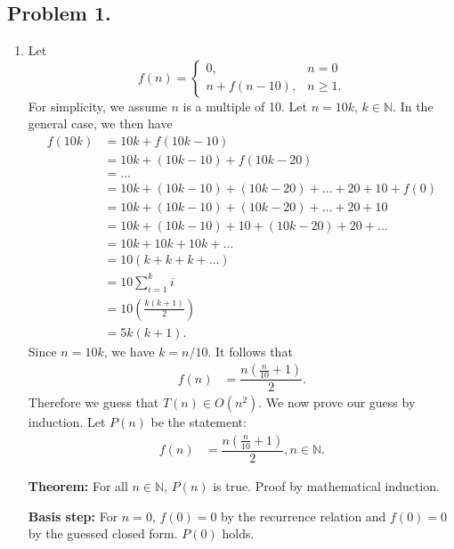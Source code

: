 \documentclass[11pt, letterpaper, titlepage]{article}
\begin{document}
\onehalfspacing

\subsection*{Problem 1.}
\begin{enumerate}[label=\alph*)]
    \item Let 
    \begin{equation}
        f(n) = \begin{cases} 
            0, & n = 0 \\
            n + f(n - 10), & n \geq 1.
        \end{cases}
    \end{equation}
    For simplicity, we assume $n$ is a multiple of 10. Let $n = 10k$, $k \in \mathbb{N}$. In the general case, we then have
    \begin{align}
        f(10k) &= 10k + f(10k - 10) \\
        &= 10k + (10k - 10) + f(10k - 20) \\
        &= \ldots \\
        &= 10k + (10k - 10) + (10k - 20) + \ldots + 20 + 10 + f(0) \\
        &= 10k + (10k - 10) + (10k - 20) + \ldots + 20 + 10 \\
        &= 10k + (10k - 10) + 10 + (10k - 20) + 20 + \ldots \\
        &= 10k + 10k + 10k + \ldots \\
        &= 10( k + k + k + \ldots ) \\
        &= 10 \sum_{i = 1}^{k} i \\
        &= 10 \left( \frac{k(k + 1)}{2} \right) \\
        &= 5k(k + 1).
    \end{align}
    Since $n = 10k$, we have $k = n/10$. It follows that 
    \begin{align}
        f(n) &= \dfrac{n\left( \frac{n}{10} + 1 \right)}{2}.
    \end{align}
    Therefore we guess that $T(n) \in O(n^2)$. We now prove our guess by induction. Let $P(n)$ be the statement: 
    \begin{align}
        f(n) &= \dfrac{n\left( \frac{n}{10} + 1 \right)}{2}, n \in \mathbb{N}.
    \end{align}

    \textbf{Theorem:} For all $n \in \mathbb{N}$, $P(n)$ is true. Proof by mathematical induction.

    \textbf{Basis step:} For $n = 0$, $f(0) = 0$ by the recurrence relation and $f(0) = 0$ by the guessed closed form. $P(0)$ holds.


\end{enumerate}
\end{document}
